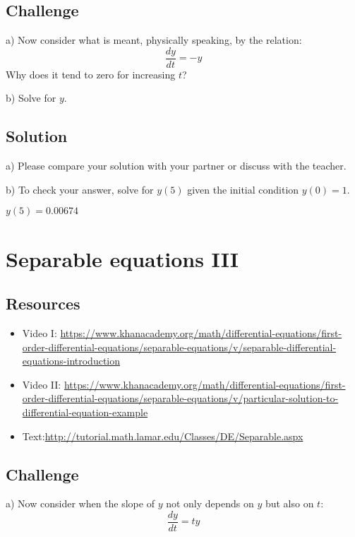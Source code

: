 \subsection*{Challenge}
a) Now consider what is meant, physically speaking, by the relation:
\begin{equation}
    \frac{dy}{dt} = -y
\end{equation}
Why does it tend to zero for increasing $t$?

b) Solve for $y$.

\subsection*{Solution}
a) Please compare your solution with your partner or discuss with the teacher.

b) To check your answer, solve for $y(5)$ given the initial condition $y(0) = 1$.

$y(5) = 0.00674$





\newpage
\section{Separable equations III}

\subsection*{Resources}
\begin{itemize}
    \item Video I: \url{https://www.khanacademy.org/math/differential-equations/first-order-differential-equations/separable-equations/v/separable-differential-equations-introduction} 
    \item Video II: \url{https://www.khanacademy.org/math/differential-equations/first-order-differential-equations/separable-equations/v/particular-solution-to-differential-equation-example}
    \item Text:\url{http://tutorial.math.lamar.edu/Classes/DE/Separable.aspx}
\end{itemize}

\subsection*{Challenge}
a) Now consider when the slope of $y$ not only depends on $y$ but also on $t$:
\begin{equation}
    \frac{dy}{dt} = ty
\end{equation}

